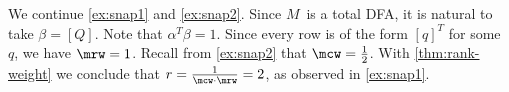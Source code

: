 \begin{exa} \label{ex:snap3}
We continue \autoref{ex:snap1} and \autoref{ex:snap2}.
Since $M$~is a total DFA, it is natural to take $\beta = [Q]$.
Note that $\alpha^T \beta = 1$.
Since every row is of the form $[q]^T$ for some~$q$, we have $\mrw = 1$.
Recall from \autoref{ex:snap2} that $\mcw = \frac12$.
With \autoref{thm:rank-weight} we conclude that $r = \frac{1}{\mcw \cdot \mrw} = 2$, as observed in \autoref{ex:snap1}.
\end{exa}
